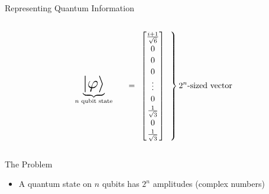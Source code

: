 \begin{frame}{Representing Quantum Information}



\begin{columns}%
	\begin{column}{1\textwidth}
	\centering
\[
\def\arraystretch{1.15}
\underbrace{\scalebox{2}{$\ket{\phi}$}}_{n \text{ qubit state}}
~~~~~=~
\left.
\begin{bmatrix*}[c]
    \frac{i+1}{\sqrt 6} \\ 0 \\ 0 \\ 0\\ \vdots \\0\\ \frac1{\sqrt 3} \\ 0 \\\frac1{\sqrt 3} 
\end{bmatrix*}
~~\right \}\text{$2^n$-sized vector}
\]  
	\end{column}
\end{columns}

\begin{alertblock}{The Problem}
	\begin{itemize}
		\item A quantum state on $n$ qubits has $2^n$ amplitudes (complex numbers)
	\end{itemize}
\end{alertblock}



\end{frame}





